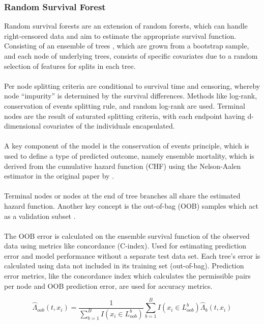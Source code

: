 \subsubsection*{Random Survival Forest}
\noindent Random survival forests \parencite{ishwaran_random_2008} are an extension of random forests, which can handle right-censored data and aim to estimate the appropriate survival function. Consisting of an ensemble of trees \parencite{ishwaran_random_2008}, which are grown from a bootstrap sample, and each node of underlying trees, consists of specific covariates due to a random selection of features for splits in each tree.
\\\\
\noindent Per node splitting criteria are conditional to survival time and censoring, whereby node “impurity” \parencite{ishwaran_random_2008} is determined by the survival differences. Methods like log-rank, conservation of events splitting rule, and random log-rank are used. Terminal nodes are the result of saturated splitting criteria, with each endpoint having d-dimensional covariates of the individuals encapsulated. 
\\\\
\noindent A key component of the model is the conservation of events principle, which is used to define a type of predicted outcome, namely ensemble mortality, which is derived from the cumulative hazard function (CHF) using the Nelson-Aalen estimator in the original paper by \parencite{ishwaran_random_2008}. 
\\\\
\noindent Terminal nodes or nodes at the end of tree branches all share the estimated hazard function. Another key concept is the out-of-bag (OOB) samples which act as a validation subset \parencite{ishwaran_random_2008}. 
\\\\
\noindent The OOB error is calculated on the ensemble survival function of the observed data using metrics like concordance (C-index). Used for estimating prediction error and model performance without a separate test data set. Each tree's error is calculated using data not included in its training set (out-of-bag). Prediction error metrics, like the concordance index which calculates the permissible pairs per node and OOB prediction error, are used for accuracy metrics. 

\begin{equation} \label{eq:ooberror}
\hat{\Lambda}_{oob}(t,x_{i}) = \frac{1}{\sum_{b=1}^{B}I(x_{i}\in L^{b}_{oob})}\sum_{b=1}^{B}I(x_{i}\in L^{b}_{oob})\hat{\Lambda}_{b}(t,x_{i})
\end{equation}


